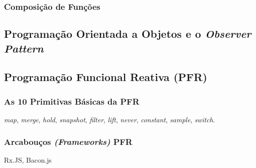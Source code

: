 \subsubsection{Composição de Funções}

%

\subsection{Programação Orientada a Objetos e o \emph{Observer Pattern}}


\subsection{Programação Funcional Reativa (PFR)}
\label{sec:pfr}




\subsubsection{As 10 Primitivas Básicas da PFR}
\label{sec:pfr-10-primitivas}

\emph{map}, \emph{merge}, \emph{hold}, \emph{snapshot}, \emph{filter},
\emph{lift}, \emph{never}, \emph{constant}, \emph{sample}, \emph{switch}.


\subsubsection{Arcabouços \emph{(Frameworks)} PFR}
\label{sec:pfr-frameworks}

Rx.JS, Bacon.js

